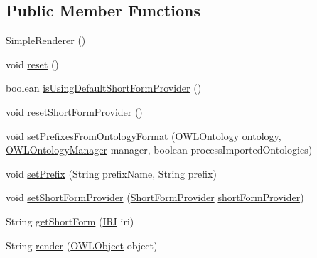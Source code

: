\subsection*{Public Member Functions}
\begin{DoxyCompactItemize}
\item 
\hyperlink{classorg_1_1semanticweb_1_1owlapi_1_1util_1_1_simple_renderer_ad375fd350954f9eb287a020782b74216}{Simple\-Renderer} ()
\item 
void \hyperlink{classorg_1_1semanticweb_1_1owlapi_1_1util_1_1_simple_renderer_a36feaa7cfbbb08c18d4716c22057d5c3}{reset} ()
\item 
boolean \hyperlink{classorg_1_1semanticweb_1_1owlapi_1_1util_1_1_simple_renderer_aae8f59a922a38097ed22619830855067}{is\-Using\-Default\-Short\-Form\-Provider} ()
\item 
void \hyperlink{classorg_1_1semanticweb_1_1owlapi_1_1util_1_1_simple_renderer_a7b42435e2376dbf3333f32dfc497cf28}{reset\-Short\-Form\-Provider} ()
\item 
void \hyperlink{classorg_1_1semanticweb_1_1owlapi_1_1util_1_1_simple_renderer_ae5364e9310b756a0758f3608b5456341}{set\-Prefixes\-From\-Ontology\-Format} (\hyperlink{interfaceorg_1_1semanticweb_1_1owlapi_1_1model_1_1_o_w_l_ontology}{O\-W\-L\-Ontology} ontology, \hyperlink{interfaceorg_1_1semanticweb_1_1owlapi_1_1model_1_1_o_w_l_ontology_manager}{O\-W\-L\-Ontology\-Manager} manager, boolean process\-Imported\-Ontologies)
\item 
void \hyperlink{classorg_1_1semanticweb_1_1owlapi_1_1util_1_1_simple_renderer_a312eb64f55a473b288a584d954a3722f}{set\-Prefix} (String prefix\-Name, String prefix)
\item 
void \hyperlink{classorg_1_1semanticweb_1_1owlapi_1_1util_1_1_simple_renderer_a09a0b0b60b3eb8c8c3d4d9b239eb016b}{set\-Short\-Form\-Provider} (\hyperlink{interfaceorg_1_1semanticweb_1_1owlapi_1_1util_1_1_short_form_provider}{Short\-Form\-Provider} \hyperlink{classorg_1_1semanticweb_1_1owlapi_1_1util_1_1_simple_renderer_aa6659dde9557d7c74c561823ac7db982}{short\-Form\-Provider})
\item 
String \hyperlink{classorg_1_1semanticweb_1_1owlapi_1_1util_1_1_simple_renderer_ade823020175260b8f5c8d235f11d5db4}{get\-Short\-Form} (\hyperlink{classorg_1_1semanticweb_1_1owlapi_1_1model_1_1_i_r_i}{I\-R\-I} iri)
\item 
String \hyperlink{classorg_1_1semanticweb_1_1owlapi_1_1util_1_1_simple_renderer_abd5791aa6fd0b825a1a52231a49f174b}{render} (\hyperlink{interfaceorg_1_1semanticweb_1_1owlapi_1_1model_1_1_o_w_l_object}{O\-W\-L\-Object} object)

\end{DoxyCompactItemize}
